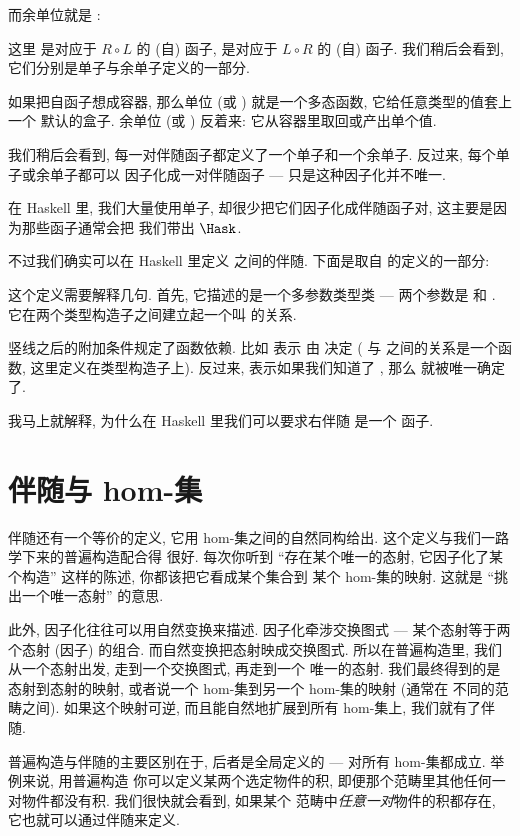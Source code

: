 而余单位就是 :

这里  是对应于 $R \circ L$ 的 (自) 函子,  是对应于 $L \circ R$ 的 (自) 函子.
我们稍后会看到, 它们分别是单子与余单子定义的一部分.

如果把自函子想成容器, 那么单位 (或 ) 就是一个多态函数, 它给任意类型的值套上一个
默认的盒子. 余单位 (或 ) 反着来: 它从容器里取回或产出单个值.

我们稍后会看到, 每一对伴随函子都定义了一个单子和一个余单子. 反过来, 每个单子或余单子都可以
因子化成一对伴随函子 --- 只是这种因子化并不唯一.

在 Haskell 里, 我们大量使用单子, 却很少把它们因子化成伴随函子对, 这主要是因为那些函子通常会把
我们带出 $\Hask$.

不过我们确实可以在 Haskell 里定义  之间的伴随. 下面是取自
 的定义的一部分:

这个定义需要解释几句. 首先, 它描述的是一个多参数类型类 --- 两个参数是  和 .
它在两个类型构造子之间建立起一个叫  的关系.

竖线之后的附加条件规定了函数依赖. 比如  表示  由  决定
( 与  之间的关系是一个函数, 这里定义在类型构造子上). 反过来, 
表示如果我们知道了 , 那么  就被唯一确定了.

我马上就解释, 为什么在 Haskell 里我们可以要求右伴随  是一个  函子.

\section{伴随与 hom-集}

伴随还有一个等价的定义, 它用 hom-集之间的自然同构给出. 这个定义与我们一路学下来的普遍构造配合得
很好. 每次你听到 ``存在某个唯一的态射, 它因子化了某个构造'' 这样的陈述, 你都该把它看成某个集合到
某个 hom-集的映射. 这就是 ``挑出一个唯一态射'' 的意思.

此外, 因子化往往可以用自然变换来描述. 因子化牵涉交换图式 --- 某个态射等于两个态射 (因子) 的组合.
而自然变换把态射映成交换图式. 所以在普遍构造里, 我们从一个态射出发, 走到一个交换图式, 再走到一个
唯一的态射. 我们最终得到的是态射到态射的映射, 或者说一个 hom-集到另一个 hom-集的映射 (通常在
不同的范畴之间). 如果这个映射可逆, 而且能自然地扩展到所有 hom-集上, 我们就有了伴随.

普遍构造与伴随的主要区别在于, 后者是全局定义的 --- 对所有 hom-集都成立. 举例来说, 用普遍构造
你可以定义某两个选定物件的积, 即便那个范畴里其他任何一对物件都没有积. 我们很快就会看到, 如果某个
范畴中\emph{任意一对}物件的积都存在, 它也就可以通过伴随来定义.

